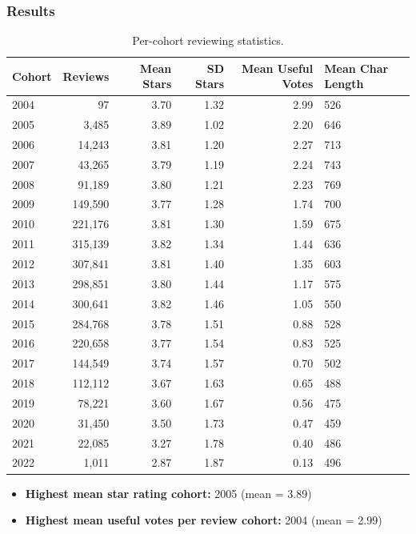 \documentclass[11pt,a4paper]{article}
\begin{document}
\subsubsection*{Results}

\begin{table}[H]
\centering\footnotesize
\caption{Per-cohort reviewing statistics.}
\begin{tabularx}{\textwidth}{lrrrrl}
\toprule
\textbf{Cohort} & \textbf{Reviews} & \textbf{Mean Stars} & \textbf{SD Stars}
  & \textbf{Mean Useful Votes} & \textbf{Mean Char Length}\\
\midrule
2004 & 97          & 3.70 & 1.32 & 2.99 & 526\\
2005 & 3{,}485     & 3.89 & 1.02 & 2.20 & 646\\
2006 & 14{,}243    & 3.81 & 1.20 & 2.27 & 713\\
2007 & 43{,}265    & 3.79 & 1.19 & 2.24 & 743\\
2008 & 91{,}189    & 3.80 & 1.21 & 2.23 & 769\\
2009 & 149{,}590   & 3.77 & 1.28 & 1.74 & 700\\
2010 & 221{,}176   & 3.81 & 1.30 & 1.59 & 675\\
2011 & 315{,}139   & 3.82 & 1.34 & 1.44 & 636\\
2012 & 307{,}841   & 3.81 & 1.40 & 1.35 & 603\\
2013 & 298{,}851   & 3.80 & 1.44 & 1.17 & 575\\
2014 & 300{,}641   & 3.82 & 1.46 & 1.05 & 550\\
2015 & 284{,}768   & 3.78 & 1.51 & 0.88 & 528\\
2016 & 220{,}658   & 3.77 & 1.54 & 0.83 & 525\\
2017 & 144{,}549   & 3.74 & 1.57 & 0.70 & 502\\
2018 & 112{,}112   & 3.67 & 1.63 & 0.65 & 488\\
2019 & 78{,}221    & 3.60 & 1.67 & 0.56 & 475\\
2020 & 31{,}450    & 3.50 & 1.73 & 0.47 & 459\\
2021 & 22{,}085    & 3.27 & 1.78 & 0.40 & 486\\
2022 & 1{,}011     & 2.87 & 1.87 & 0.13 & 496\\
\bottomrule
\end{tabularx}
\end{table}

\begin{itemize}
  \item \textbf{Highest mean star rating cohort:} 2005 (mean = 3.89)
  \item \textbf{Highest mean useful votes per review cohort:} 2004 (mean = 2.99)
\end{itemize}
\end{document}
